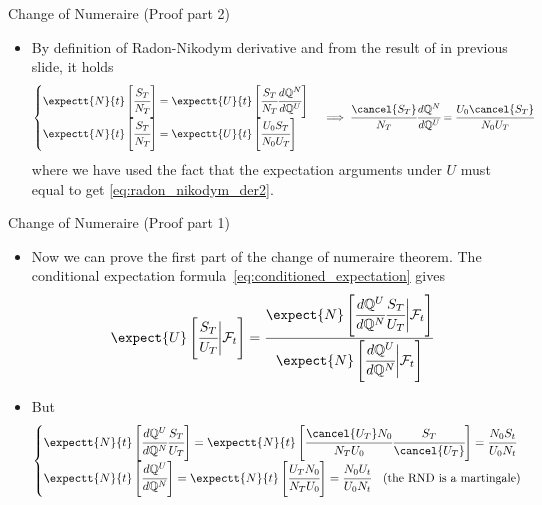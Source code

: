 \documentclass{beamer}
\begin{document}
\begin{frame}{Change of Numeraire (Proof part 2)}
	\begin{itemize}
	\item By definition of Radon-Nikodym derivative and from the result of in previous slide, it holds
  \begin{equation*}
  	\begin{cases}
    \expectt{N}{t}\left[\cfrac{S_T}{N_T}\right] =\expectt{U}{t}\left[\cfrac{S_T}{N_T} \cfrac{d\mathbb{Q}^N}{d\mathbb{Q}^U}\right] \\
    \expectt{N}{t}\left[\cfrac{S_T}{N_T}\right] =\expectt{U}{t}\left[\cfrac{U_0 S_T}{N_0 U_T}\right]
    \end{cases}\implies
	\cfrac{\cancel{S_T}}{N_T} \cfrac{d\mathbb{Q}^N}{d\mathbb{Q}^U} = \cfrac{U_0 \cancel{S_T}}{N_0 U_T}
  \end{equation*}
	where we have used the fact that the expectation arguments under $U$ must equal to get \cref{eq:radon_nikodym_der2}. 
  \end{itemize}
\myendproof
\end{frame}

\begin{frame}{Change of Numeraire (Proof part 1)}
  \begin{itemize}
  \item<1-> Now we can prove the first part of the change of numeraire theorem. The conditional expectation formula~\cref{eq:conditioned_expectation} gives
    \begin{equation*}
      \expect{U}\left[\cfrac{S_T}{U_T}\bigg|\mathcal{F}_t\right]=\cfrac{\expect{N}\left[\cfrac{d\mathbb{Q}^U}{d\mathbb{Q}^N}\cfrac{S_T}{U_T}\bigg|\mathcal{F}_t\right]}{\expect{N}\left[\cfrac{d\mathbb{Q}^U}{d\mathbb{Q}^N}\bigg|\mathcal{F}_t\right]}
    \end{equation*}
  \item<2-> But 
    \begin{equation*}
      \begin{cases}
	\expectt{N}{t}\left[\cfrac{d\mathbb{Q}^U}{d\mathbb{Q}^N}\cfrac{S_T}{U_T}\right]= \expectt{N}{t}\left[\cfrac{\cancel{U_T} N_0}{N_T U_0}\cfrac{S_T}{\cancel{U_T}}\right]=\cfrac{N_0 S_t}{U_0 N_t} \\
	\expectt{N}{t}\left[\cfrac{d\mathbb{Q}^U}{d\mathbb{Q}^N}\right]= \expectt{N}{t}\left[\cfrac{U_T N_0}{N_T U_0}\right] = \cfrac{N_0 U_t}{U_0 N_t}\quad\text{(the RND is a martingale)}
      \end{cases}
    \end{equation*}
  \end{itemize}
\end{frame}	
\end{document}
